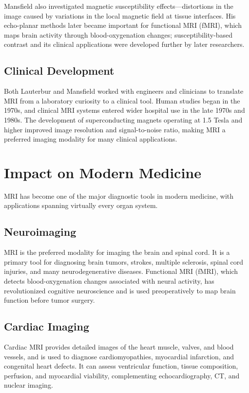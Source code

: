 Mansfield also investigated magnetic susceptibility effects---distortions in the image caused by variations in the local magnetic field at tissue interfaces. His echo-planar methods later became important for functional MRI (fMRI), which maps brain activity through blood-oxygenation changes; susceptibility-based contrast and its clinical applications were developed further by later researchers.

\subsection{Clinical Development}

Both Lauterbur and Mansfield worked with engineers and clinicians to translate MRI from a laboratory curiosity to a clinical tool. Human studies began in the 1970s, and clinical MRI systems entered wider hospital use in the late 1970s and 1980s. The development of superconducting magnets operating at 1.5 Tesla and higher improved image resolution and signal-to-noise ratio, making MRI a preferred imaging modality for many clinical applications.

\section{Impact on Modern Medicine}

MRI has become one of the major diagnostic tools in modern medicine, with applications spanning virtually every organ system.

\subsection{Neuroimaging}

MRI is the preferred modality for imaging the brain and spinal cord. It is a primary tool for diagnosing brain tumors, strokes, multiple sclerosis, spinal cord injuries, and many neurodegenerative diseases. Functional MRI (fMRI), which detects blood-oxygenation changes associated with neural activity, has revolutionized cognitive neuroscience and is used preoperatively to map brain function before tumor surgery.

\subsection{Cardiac Imaging}

Cardiac MRI provides detailed images of the heart muscle, valves, and blood vessels, and is used to diagnose cardiomyopathies, myocardial infarction, and congenital heart defects. It can assess ventricular function, tissue composition, perfusion, and myocardial viability, complementing echocardiography, CT, and nuclear imaging.

